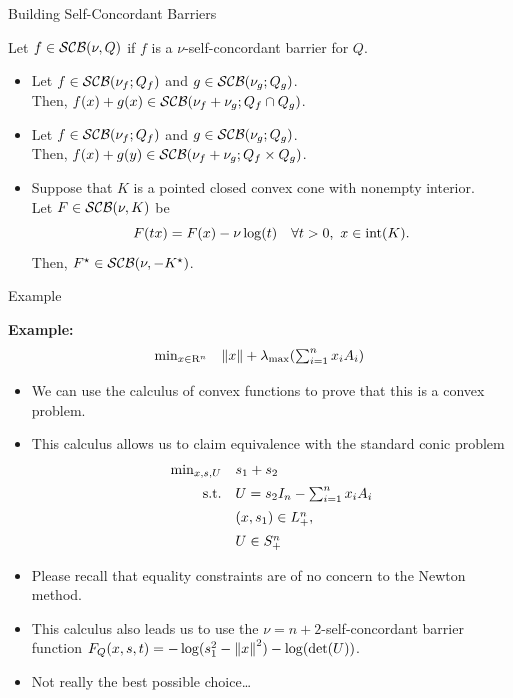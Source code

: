 \documentclass[9pt]{beamer}
\begin{document}
\begin{frame}{Building Self-Concordant Barriers}

  Let $f\in \mathcal{SCB}(\nu, Q)$ if $f$ is a $\nu$-self-concordant barrier for $Q$.

  \vfill
  
  \begin{itemize}
    \setlength\itemsep{1.5em}
  \item Let $f \in \mathcal{SCB}(\nu_f; Q_f)$ and $g \in \mathcal{SCB}(\nu_g; Q_g)$. \\
    Then, $f(x) + g(x) \in \mathcal{SCB}(\nu_f+\nu_g;Q_f\cap Q_g)$.
  \item Let $f \in \mathcal{SCB}(\nu_f; Q_f)$ and $g \in \mathcal{SCB}(\nu_g; Q_g)$. \\
    Then, $f(x) + g(y) \in \mathcal{SCB}(\nu_f+\nu_g;Q_f\times Q_g)$.
  \item<2-> Suppose that $K$ is a pointed closed convex cone with nonempty interior. \\
    Let $F\in\mathcal{SCB}(\nu, K)$ be 
    \[
      F(t x) = F(x) - \nu \log(t) \quad \forall t>0, ~x\in \operatorname{int}(K).
    \]
    Then, $F^\star \in \mathcal{SCB}(\nu, -K^\star)$.
  \end{itemize}
  
\end{frame}

\begin{frame}{Example}

  \textbf{Example:}
  \[
    \begin{array}{rl}
      \min_{x\in \mathrm{R}^n} & \left\|x\right\|+ \lambda_{\max}(\textstyle\sum_{i=1}^n x_i A_i)
    \end{array}
  \]

  \begin{itemize}
  \item We can use the calculus of convex functions to prove that this is a convex problem.
  \item<2-> This calculus allows us to claim equivalence with the standard conic problem
    \[
      \begin{array}{rl}
        \min_{x, s, U} & s_1 + s_2 \\[0.5em]
        \mathrm{s.t.}  & U = \textstyle s_2 I_n-\sum_{i=1}^n x_i A_i\\[0.5em]
                       & (x, s_1) \in L^n_{+}, \\[0.5em]
                       & U \in S^n_+
      \end{array}
    \]
  \item<3-> Please recall that equality constraints are of no concern to the Newton method.
  \item<4-> This calculus also leads us to use the $\nu=n+2$-self-concordant barrier function $F_Q(x, s, t) = -\log(s_1^2-\left\|x\right\|^2)-\log(\det(U))$.
  \item<5-> Not really the best possible choice\dots
  \end{itemize}
  
\end{frame}
\end{document}
